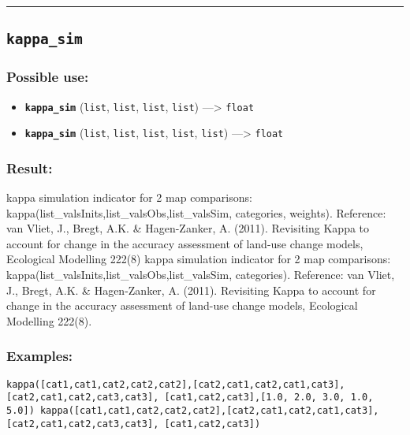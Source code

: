 \documentclass[]{book}
\providecommand{\tightlist}{%
  \setlength{\itemsep}{0pt}\setlength{\parskip}{0pt}}
\theoremstyle{definition}
\theoremstyle{definition}
\theoremstyle{definition}
\theoremstyle{remark}
\begin{document}
\begin{center}\rule{0.5\linewidth}{\linethickness}\end{center}

\subsection{\texorpdfstring{\texttt{kappa\_sim}}{kappa\_sim}}\label{kappa_sim}

\subsubsection{Possible use:}\label{possible-use-312}

\begin{itemize}
\tightlist
\item
  \textbf{\texttt{kappa\_sim}} (\texttt{list}, \texttt{list},
  \texttt{list}, \texttt{list}) ---\textgreater{} \texttt{float}
\item
  \textbf{\texttt{kappa\_sim}} (\texttt{list}, \texttt{list},
  \texttt{list}, \texttt{list}, \texttt{list}) ---\textgreater{}
  \texttt{float}
\end{itemize}

\subsubsection{Result:}\label{result-302}

kappa simulation indicator for 2 map comparisons:
kappa(list\_valsInits,list\_valsObs,list\_valsSim, categories, weights).
Reference: van Vliet, J., Bregt, A.K. \& Hagen-Zanker, A. (2011).
Revisiting Kappa to account for change in the accuracy assessment of
land-use change models, Ecological Modelling 222(8) kappa simulation
indicator for 2 map comparisons:
kappa(list\_valsInits,list\_valsObs,list\_valsSim, categories).
Reference: van Vliet, J., Bregt, A.K. \& Hagen-Zanker, A. (2011).
Revisiting Kappa to account for change in the accuracy assessment of
land-use change models, Ecological Modelling 222(8).

\subsubsection{Examples:}\label{examples-219}

\begin{verbatim}
kappa([cat1,cat1,cat2,cat2,cat2],[cat2,cat1,cat2,cat1,cat3],[cat2,cat1,cat2,cat3,cat3], [cat1,cat2,cat3],[1.0, 2.0, 3.0, 1.0, 5.0]) kappa([cat1,cat1,cat2,cat2,cat2],[cat2,cat1,cat2,cat1,cat3],[cat2,cat1,cat2,cat3,cat3], [cat1,cat2,cat3]) 
\end{verbatim}
\end{document}
